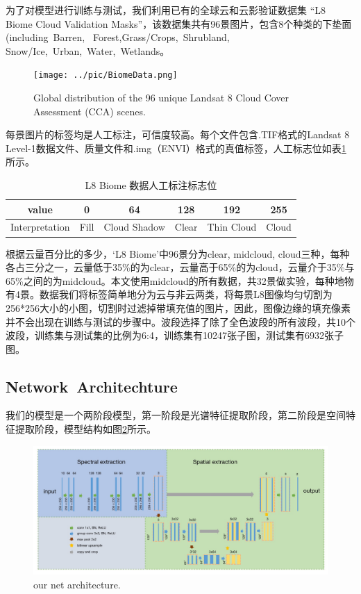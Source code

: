 \documentclass[UTF8]{ctexart}
\begin{document}
为了对模型进行训练与测试，我们利用已有的全球云和云影验证数据集
“L8 Biome Cloud Validation Masks”\cite{foga2017cloud_data}，该数据集共有96景图片，包含8个种类的下垫面(including Barren, 
Forest,Grass/Crops, Shrubland, Snow/Ice, Urban, Water, Wetlands。

\begin{figure}[H]
    \centering
    \texttt{[image: ../pic/BiomeData.png]}
    \caption{Global distribution of the 96 unique Landsat 8 Cloud Cover Assessment (CCA) scenes.}
    \label{fig:label}
\end{figure}

每景图片的标签均是人工标注，可信度较高。每个文件包含.TIF格式的Landsat 8 Level-1数据文件、质量文件和.img（ENVI）格式的真值标签，人工标志位如表\ref{BiomeFlag}所示。

\begin{table}[H]
    \centering
    \begin{tabular}{c|ccccc}
    \hline
    \hline
    value& 0& 64& 128& 192& 255\\
    \hline
    Interpretation&	Fill& Cloud Shadow& Clear &Thin Cloud& Cloud\\
    \hline
    \hline
    \end{tabular}
    \caption{L8 Biome 数据人工标注标志位}
    \label{BiomeFlag}
    \end{table}

根据云量百分比的多少，‘L8 Biome’中96景分为clear, midcloud, cloud三种，每种各占三分之一，云量低于35\%的为clear，云量高于65\%的为cloud，云量介于35\%与65\%之间的为midcloud。本文使用midcloud的所有数据，共32景做实验，每种地物有4景。数据我们将标签简单地分为云与非云两类，将每景L8图像均匀切割为256*256大小的小图，切割时过滤掉带填充值的图片，因此，图像边缘的填充像素并不会出现在训练与测试的步骤中。波段选择了除了全色波段的所有波段，共10个波段，训练集与测试集的比例为6:4，训练集有10247张子图，测试集有6932张子图。

\subsection{Network Architechture}

我们的模型是一个两阶段模型，第一阶段是光谱特征提取阶段，第二阶段是空间特征提取阶段，模型结构如图\ref{fig_myModel}所示。
\begin{figure}[H]
    \centering
    \includegraphics[scale=0.26]{../pic/spoon.jpg}
    \caption{our net architecture.}
    \label{fig_myModel}
\end{figure}
\end{document}
